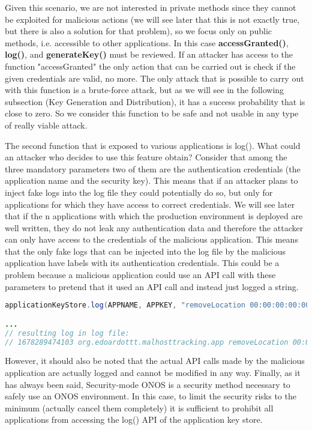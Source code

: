 \documentclass[a4paper,10pt]{memoir}
\begin{document}
Given this scenario, we are not interested in private methods since they cannot be exploited for malicious actions (we will see later that this is not exactly true, but there is also a solution for that problem), so we focus only on public methods, i.e. accessible to other applications. In this case \textbf{accessGranted()}, \textbf{log()}, and \textbf{generateKey()} must be reviewed.
If an attacker has access to the function "accessGranted" the only action that can be carried out is check if the given credentials are valid, no more. The only attack that is possible to carry out with this function is a brute-force attack, but as we will see in the following subsection (Key Generation and Distribution), it has a success probability that is close to zero. So we consider this function to be safe and not usable in any type of really viable attack.
\medskip

The second function that is exposed to various applications is log(). What could an attacker who decides to use this feature obtain? Consider that among the three mandatory parameters two of them are the authentication credentials (the application name and the security key). This means that if an attacker plans to inject fake logs into the log file they could potentially do so, but only for applications for which they have access to correct credentials. We will see later that if the n applications with which the production environment is deployed are well written, they do not leak any authentication data and therefore the attacker can only have access to the credentials of the malicious application. This means that the only fake logs that can be injected into the log file by the malicious application have labels with its authentication credentials. This could be a problem because a malicious application could use an API call with these parameters to pretend that it used an API call and instead just logged a string.
\begin{lstlisting}[language=Java]
applicationKeyStore.log(APPNAME, APPKEY, "removeLocation 00:00:00:00:00:04/None of:0000000000000002/1");

...
// resulting log in log file:
// 1678289474103 org.edoardottt.malhosttracking.app removeLocation 00:00:00:00:00:04/None of:0000000000000002/1
\end{lstlisting}
However, it should also be noted that the actual API calls made by the malicious application are actually logged and cannot be modified in any way.
Finally, as it has always been said, Security-mode ONOS is a security method necessary to safely use an ONOS environment. In this case, to limit the security risks to the minimum (actually cancel them completely) it is sufficient to prohibit all applications from accessing the log() API of the application key store.
\medskip
\end{document}
